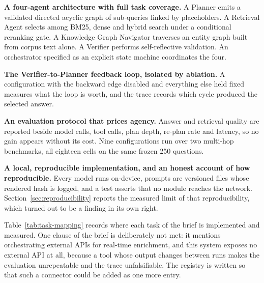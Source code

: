 \textbf{A four-agent architecture with full task coverage.} A Planner emits a
validated directed acyclic graph of sub-queries linked by placeholders. A
Retrieval Agent selects among BM25, dense and hybrid search under a conditional
reranking gate. A Knowledge Graph Navigator traverses an entity graph built from
corpus text alone. A Verifier performs self-reflective validation. An
orchestrator specified as an explicit state machine coordinates the four.

\textbf{The Verifier-to-Planner feedback loop, isolated by ablation.} A
configuration with the backward edge disabled and everything else held fixed
measures what the loop is worth, and the trace records which cycle produced the
selected answer.

\textbf{An evaluation protocol that prices agency.} Answer and retrieval quality
are reported beside model calls, tool calls, plan depth, re-plan rate and
latency, so no gain appears without its cost. Nine configurations run over two
multi-hop benchmarks, all eighteen cells on the same frozen 250 questions.

\textbf{A local, reproducible implementation, and an honest account of how
reproducible.} Every model runs on-device, prompts are versioned files whose
rendered hash is logged, and a test asserts that no module reaches the network.
Section~\ref{sec:reproducibility} reports the measured limit of that
reproducibility, which turned out to be a finding in its own right.

Table~\ref{tab:task-mapping} records where each task of the brief is
implemented and measured. One clause of the brief is deliberately not met: it
mentions orchestrating external APIs for real-time enrichment, and this system
exposes no external API at all, because a tool whose output changes between
runs makes the evaluation unrepeatable and the trace unfalsifiable. The
registry is written so that such a connector could be added as one more entry.

